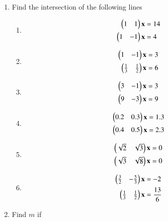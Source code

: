 \begin{enumerate}[label=\arabic*.,ref=\thesubsection.\theenumi]
%
%
\item Find the intersection of the following lines
%
\begin{enumerate}[itemsep=2pt]
\item
\begin{align}
\begin{split}
\begin{pmatrix}1 & 1 \end{pmatrix}\mathbf{x}&=14
\\
\begin{pmatrix}1 & -1 \end{pmatrix}\mathbf{x}&=4
\end{split}
\end{align}
\item
\begin{align}
\begin{split}
\begin{pmatrix}1 & -1 \end{pmatrix}\mathbf{x}&=3
\\
\begin{pmatrix}\frac{1}{3} & \frac{1}{2} \end{pmatrix}\mathbf{x}&=6
\end{split}
\end{align}
\item
\begin{align}
\begin{split}
\begin{pmatrix}3 & -1 \end{pmatrix}\mathbf{x}&=3
\\
\begin{pmatrix}9 & -3 \end{pmatrix}\mathbf{x}&=9
\end{split}
\end{align}
\item
\begin{align}
\begin{split}
\begin{pmatrix}0.2 & 0.3 \end{pmatrix}\mathbf{x}&=1.3
\\
\begin{pmatrix}0.4 & 0.5 \end{pmatrix}\mathbf{x}&=2.3
\end{split}
\end{align}
\item
\begin{align}
\begin{split}
\begin{pmatrix}\sqrt{2} & \sqrt{3} \end{pmatrix}\mathbf{x}&=0
\\
\begin{pmatrix}\sqrt{3} & \sqrt{8} \end{pmatrix}\mathbf{x}&=0
\end{split}
\end{align}
\item
\begin{align}
\begin{split}
\begin{pmatrix}\frac{3}{2} & -\frac{5}{3} \end{pmatrix}\mathbf{x}&=-2
\\
\begin{pmatrix}\frac{1}{3} & \frac{1}{2} \end{pmatrix}\mathbf{x}&=\frac{13}{6}
\end{split}
\end{align}
\end{enumerate}
%
\item Find $m$ if 

\end{enumerate}
